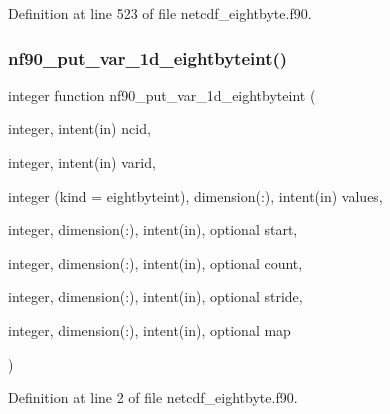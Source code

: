 Definition at line 523 of file netcdf\+\_\+eightbyte.\+f90.

\mbox{\label{netcdf__eightbyte_8f90_a47c837921b0c4c1085340afa2908bd27}} 
\subsubsection{\texorpdfstring{nf90\+\_\+put\+\_\+var\+\_\+1d\+\_\+eightbyteint()}{nf90\_put\_var\_1d\_eightbyteint()}}
{\footnotesize\ttfamily integer function nf90\+\_\+put\+\_\+var\+\_\+1d\+\_\+eightbyteint (\begin{DoxyParamCaption}\item[{integer, intent(in)}]{ncid,  }\item[{integer, intent(in)}]{varid,  }\item[{integer (kind = eightbyteint), dimension(\+:), intent(in)}]{values,  }\item[{integer, dimension(\+:), intent(in), optional}]{start,  }\item[{integer, dimension(\+:), intent(in), optional}]{count,  }\item[{integer, dimension(\+:), intent(in), optional}]{stride,  }\item[{integer, dimension(\+:), intent(in), optional}]{map }\end{DoxyParamCaption})}



Definition at line 2 of file netcdf\+\_\+eightbyte.\+f90.

\mbox{\label{netcdf__eightbyte_8f90_a5f74fbc3c4b758731991344b922e79f9}} 
